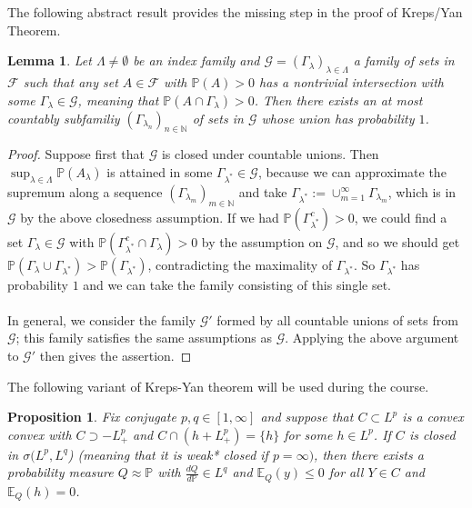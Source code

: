 \documentclass[12pt,a4paper, twoside]{article}
\newtheorem{lem}{Lemma}[section]
\newtheorem{prop}{Proposition}[section]
\theoremstyle{definition}
\newcommand{\EE}{\mathbb{E}} %
\newcommand{\PP}{\mathbb{P}} %
\begin{document}
\newpage
The following abstract result provides the missing step in the proof of Kreps/Yan Theorem.
\begin{lem} Let $\Lambda \neq \emptyset$ be an index family and $\mathcal{G}= ( \Gamma_\lambda)_{ \lambda \in \Lambda}$ a family of sets in $\mathcal{F}$ such that any set $A \in \mathcal{F}$ with $\PP(A) >0$ has a nontrivial intersection with some $\Gamma_\lambda \in \mathcal{G}$, meaning that $\PP(A \cap \Gamma_\lambda)>0$. Then there exists an at most countably subfamiliy $( \Gamma_{ \lambda_n})_{n \in \mathbb{N}}$ of sets in $\mathcal{G}$ whose union has probability $1$. 
\end{lem}
\begin{proof}
Suppose first that $\mathcal{G}$ is closed under countable unions. Then $\sup_{ \lambda \in \Lambda} \PP(A_\lambda)$ is attained in some $\Gamma_{\lambda^*} \in \mathcal{G}$, because we can approximate the supremum along a sequence $( \Gamma_{\lambda_m})_{m \in \mathbb{N}}$ and take $\Gamma_{ \lambda^*} := \cup_{m=1}^\infty \Gamma_{ \lambda_m}$, which is in $\mathcal{G}$ by the above closedness assumption. If we had $\PP( \Gamma_{ \lambda^*}^c) >0$, we could find a set $\Gamma_\lambda \in \mathcal{G}$ with $\PP( \Gamma_{ \lambda^*}^c \cap \Gamma_\lambda) >0$ by the assumption on $\mathcal{G}$, and so we should get $\PP( \Gamma_\lambda \cup \Gamma_{\lambda^*}) > \PP( \Gamma_{\lambda^*})$,  contradicting the maximality of $\Gamma_{\lambda^*}$. So $\Gamma_{\lambda^*}$ has probability $1$ and we can take the family consisting of this single set.
\\
\\
In general, we consider the family $\mathcal{G}'$ formed by all countable unions of sets from $\mathcal{G}$; this family satisfies the same assumptions as $\mathcal{G}$. Applying the above argument to $\mathcal{G}'$ then gives the assertion. 
\end{proof}
The following variant of Kreps-Yan theorem will be used during the course.
\begin{prop} Fix conjugate $p,q \in [1, \infty]$ and suppose that $C \subset L^p$ is a convex convex with $C \supset -L_+^p$ and $C \cap (h + L_+^p) = \{h\}$ for some $h \in L^p$. If $C$ is closed in $\sigma(L^p,L^q$) (meaning that it is weak* closed if $p= \infty)$, then there exists a probability measure $Q \approx \PP$ with $\frac{dQ}{d\PP} \in L^q$ and $\EE_Q(y) \leq 0$ for all $Y \in C$ and $\EE_Q(h) =0$. 
\end{prop}
\end{document}
